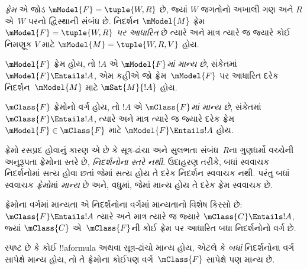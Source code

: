 \documentclass[../../../include/open-logic-section]{subfiles}
\begin{document}


\begin{defn}
  \emph{ફ્રેમ} એ જોડ $\mModel{F} = \tuple{W,R}$ છે, જ્યાં
  $W$ જગતોનો અખાલી ગણ અને $R$ એ~$W$ પરનો
  દ્વિસ્થાની સંબંધ છે. નિદર્શન $\mModel{M}$ ફ્રેમ
  $\mModel{F} = \tuple{W,R}$ \emph{પર આધારિત} છે
  ત્યારે અને માત્ર ત્યારે જ જ્યારે કોઈ નિમણૂક $V$
  માટે $\mModel{M} = \tuple{W, R, V}$ હોય.
\end{defn}

\begin{defn}
  $\mModel{F}$ ફ્રેમ હોય, તો $!A$ એ
  \emph{$\mModel{F}$માં માન્ય છે}, સંકેતમાં
  $\mModel{F} \Entails !A$, એમ કહીએ જો
  ફ્રેમ~$\mModel{F}$ પર આધારિત દરેક નિદર્શન~$\mModel{M}$
  માટે $\mSat{M}{!A}$ હોય.
  
  $\mClass{F}$ ફ્રેમોનો વર્ગ હોય, તો $!A$ એ
  \emph{$\mClass{F}$માં માન્ય છે}, સંકેતમાં
  $\mClass{F} \Entails !A$, ત્યારે અને માત્ર ત્યારે જ
  જ્યારે દરેક ફ્રેમ~$\mModel{F} \in \mClass{F}$ માટે
  $\mModel{F} \Entails !A$ હોય.
\end{defn}

ફ્રેમો રસપ્રદ હોવાનું કારણ એ છે કે સૂત્ર-ઢાંચા અને
સુલભતા સંબંધ~$R$ના ગુણધર્મો વચ્ચેની અનુરૂપતા
ફ્રેમોના સ્તરે છે, \emph{નિદર્શનોના સ્તરે નથી}.
ઉદાહરણ તરીકે,  બધાં સ્વવાચક નિદર્શનોમાં
સત્ય હોવા છતાં જેમાં  સત્ય હોય તે દરેક
નિદર્શન સ્વવાચક નથી. પરંતુ  બધાં સ્વવાચક
\emph{ફ્રેમો}માં \emph{માન્ય} છે અને, વધુમાં, જેમાં
 માન્ય હોય તે દરેક ફ્રેમ સ્વવાચક છે.

\begin{rem}
ફ્રેમોના વર્ગમાં માન્યતા એ નિદર્શનોના વર્ગમાં
માન્યતાનો વિશેષ કિસ્સો છે: $\mClass{F} \Entails !A$
ત્યારે અને માત્ર ત્યારે જ જ્યારે
$\mClass{C} \Entails !A$, જ્યાં $\mClass{C}$
એ~$\mClass{F}$ની કોઈ ફ્રેમ પર આધારિત બધા
નિદર્શનોનો વર્ગ છે.

સ્પષ્ટ છે કે કોઈ !!a{formula} અથવા સૂત્ર-ઢાંચો
માન્ય હોય, એટલે કે \emph{બધાં} નિદર્શનોના વર્ગ
સાપેક્ષે માન્ય હોય, તો તે ફ્રેમોના કોઈપણ
વર્ગ~$\mClass{F}$ સાપેક્ષે પણ માન્ય છે.
\end{rem}
\end{document}
